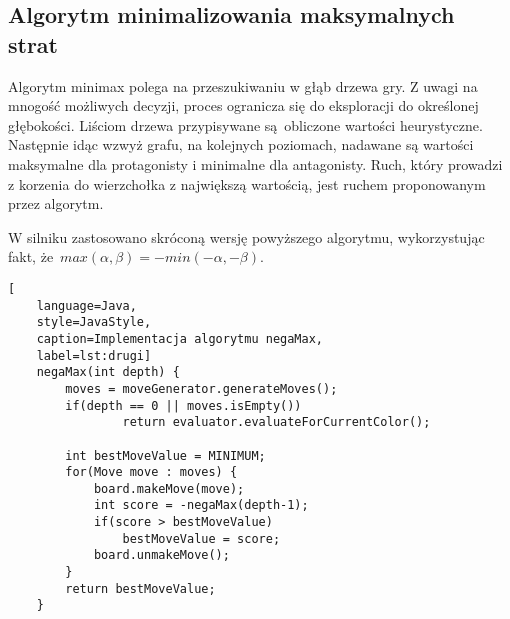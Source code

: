 \subsection{Algorytm minimalizowania maksymalnych strat}
\label{subsec:algorytm-minimalizowania-maksymalnych-strat}

Algorytm minimax polega na przeszukiwaniu w głąb drzewa gry.
Z uwagi na mnogość możliwych decyzji, proces ogranicza się do eksploracji do określonej głębokości.
Liściom drzewa przypisywane są~obliczone wartości heurystyczne.
Następnie idąc wzwyż grafu, na kolejnych poziomach, nadawane są wartości maksymalne dla protagonisty i minimalne dla antagonisty.
Ruch, który prowadzi z korzenia do wierzchołka z największą wartością, jest ruchem proponowanym przez algorytm.

W silniku zastosowano skróconą wersję powyższego algorytmu, wykorzystując fakt, że~$max(\alpha, \beta) = -min(-\alpha, -\beta)$.

\newpage


\begin{lstlisting}[
    language=Java,
    style=JavaStyle,
    caption=Implementacja algorytmu negaMax,
    label=lst:drugi]
    negaMax(int depth) {
        moves = moveGenerator.generateMoves();
        if(depth == 0 || moves.isEmpty())
                return evaluator.evaluateForCurrentColor();

        int bestMoveValue = MINIMUM;
        for(Move move : moves) {
            board.makeMove(move);
            int score = -negaMax(depth-1);
            if(score > bestMoveValue)
                bestMoveValue = score;
            board.unmakeMove();
        }
        return bestMoveValue;
    }
\end{lstlisting}


